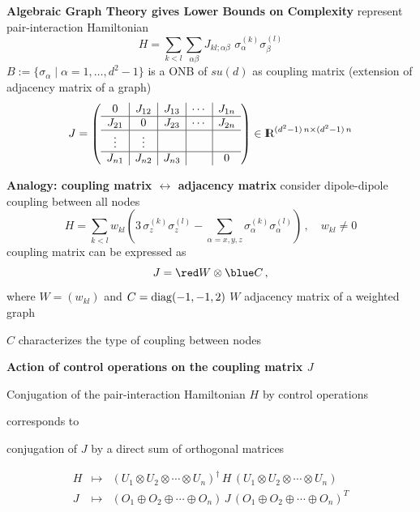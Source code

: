 \documentclass[portrait]{seminar}
\begin{document}
\begin{slide}
{\bf Algebraic Graph Theory gives Lower Bounds on Complexity}
\vfill
represent {\blue pair-interaction Hamiltonian}
\[
H = 
\sum_{k<l} \sum_{\alpha\beta} J_{kl;\alpha\beta}\,\, 
\sigma_\alpha^{(k)}\sigma_\beta^{(l)}
\]
\quad\quad\quad\quad\quad\quad 
$B:=\{\sigma_\alpha\mid\alpha=1,\ldots,d^2-1\}$ is a ONB of $su(d)$
\vfill
as {\blue coupling matrix} (extension of adjacency matrix of a graph)
\[
J=\left(
\begin{array}{c|c|c|c|c}
0      & J_{12} & J_{13} & \cdots & J_{1n} \\ \hline
J_{21} & 0      & J_{23} & \cdots & J_{2n} \\ \hline
\vdots & \vdots &        &        &        \\ \hline
J_{n1} & J_{n2} & J_{n3} &        & 0 
\end{array}
\right)\in\R^{(d^2-1)\,n\times (d^2-1)\,n}
\]
\vfill
\end{slide}

\begin{slide}
{\bf Analogy: coupling matrix $\leftrightarrow$ adjacency matrix}
\vfill
consider dipole-dipole coupling between all nodes
\[
H=\sum_{k<l} w_{kl} (3\,\sigma_z^{(k)}\sigma_z^{(l)} - 
\sum_{\alpha=x,y,z} \sigma_\alpha^{(k)}\sigma_\alpha^{(l)})\,,
\quad w_{kl}\neq 0
\]
\vfill
coupling matrix can be expressed as
\[
J={\red W}\otimes {\blue C}\,,
\]
where $W=(w_{kl})$ and $C={\rm diag}(-1,-1,2)$
\vfill
{\red $W$ adjacency matrix} of a weighted graph

{\blue $C$ characterizes the type of coupling} between nodes
\vfill
\end{slide}


\begin{slide}
{\large {\bf Action of control operations on the coupling matrix $J$}}
\vfill
\begin{center}
{\blue Conjugation of the pair-interaction Hamiltonian $H$ by control
operations}

corresponds to

{\blue conjugation of $J$ by a direct sum of orthogonal matrices}
\end{center}
\[
\begin{array}{ccc}
H & \mapsto & (U_1\otimes U_2\otimes\cdots\otimes U_n)^\dagger\, H\, 
(U_1\otimes U_2\otimes\cdots\otimes U_n) \\
J & \mapsto & (O_1\oplus O_2\oplus\cdots\oplus O_n)\, J\,
(O_1\oplus O_2\oplus\cdots\oplus O_n)^T
\end{array}
\]
\vfill
\end{slide}
\end{document}
